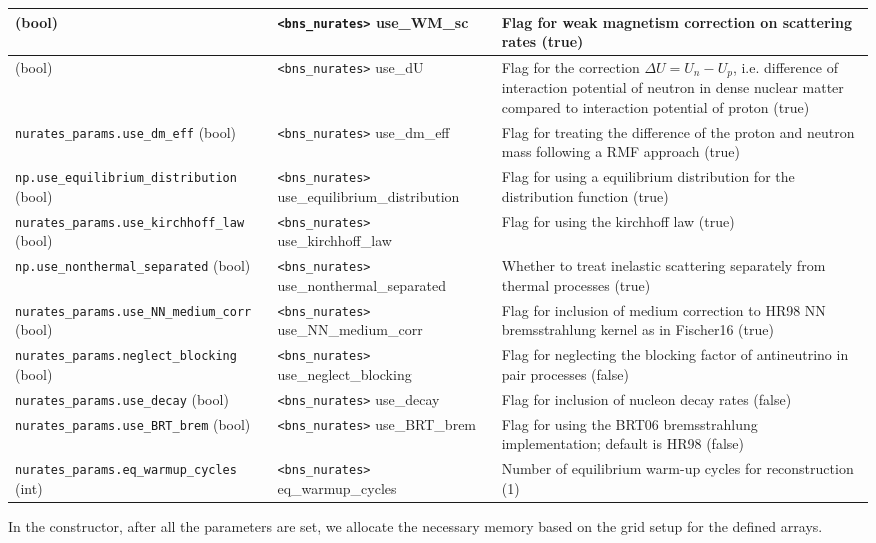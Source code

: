 \documentclass{article}
\newcommand{\var}[1]{%
  {\setlength{\fboxsep}{1.5pt}%
   \colorbox{varbg}{\textcolor{varfg}{\texttt{\small #1}}}}}
\begin{document}
\begin{tabularx}{\textwidth}{|
>{\raggedright\arraybackslash}X|
>{\raggedright\arraybackslash}X|
>{\raggedright\arraybackslash}X|}
  \hline
  \var{nurates\_params.use\_WM\_sc} (bool)&\var{<bns\_nurates>} use\_WM\_sc&Flag for weak magnetism correction on scattering rates (true)\\
  \hline
  \var{nurates\_params.use\_dU} (bool)&\var{<bns\_nurates>} use\_dU&Flag for the correction $\Delta U=U_n-U_p$, i.e. difference of interaction potential of neutron in dense nuclear matter compared to interaction potential of proton (true)\\
  \hline
  \var{nurates\_params.use\_dm\_eff} (bool)&\var{<bns\_nurates>} use\_dm\_eff&Flag for treating the difference of the proton and neutron mass following a RMF approach (true)\\
  \hline
  \var{np.use\_equilibrium\_distribution} (bool)&\var{<bns\_nurates>} use\_equilibrium\_distribution&Flag for using a equilibrium distribution for the distribution function (true)\\
  \hline
  \var{nurates\_params.use\_kirchhoff\_law} (bool)&\var{<bns\_nurates>} use\_kirchhoff\_law&Flag for using the kirchhoff law (true)\\
  \hline
  \var{np.use\_nonthermal\_separated} (bool)&\var{<bns\_nurates>} use\_nonthermal\_separated&Whether to treat inelastic scattering separately from thermal processes (true)\\
  \hline
  \var{nurates\_params.use\_NN\_medium\_corr} (bool)&\var{<bns\_nurates>} use\_NN\_medium\_corr&Flag for inclusion of medium correction to HR98 NN bremsstrahlung kernel as in Fischer16 (true)\\
  \hline
  \var{nurates\_params.neglect\_blocking} (bool)&\var{<bns\_nurates>} use\_neglect\_blocking&Flag for neglecting the blocking factor of antineutrino in pair processes (false)\\
  \hline
  \var{nurates\_params.use\_decay} (bool)&\var{<bns\_nurates>} use\_decay&Flag for inclusion of nucleon decay rates (false)\\
  \hline
  \var{nurates\_params.use\_BRT\_brem} (bool)&\var{<bns\_nurates>} use\_BRT\_brem&Flag for using the BRT06 bremsstrahlung implementation; default is HR98 (false)\\
  \hline
  \var{nurates\_params.eq\_warmup\_cycles} (int)&\var{<bns\_nurates>} eq\_warmup\_cycles&Number of equilibrium warm-up cycles for reconstruction (1)\\
  \hline
\end{tabularx}
In the constructor, after all the parameters are set, we allocate the necessary memory based on the grid setup for the defined arrays.\\
\end{document}
